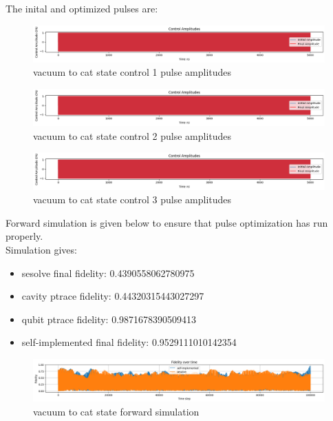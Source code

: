 \documentclass{article}
\begin{document}
The inital and optimized pulses are: 
\begin{figure}[H]
    \centering
    \includegraphics[width=0.6\linewidth]{vac2cat_effective_Hamiltonian_GRAPE_control1.png}
    \caption{vacuum to cat state control 1 pulse amplitudes}
    \label{fig:vac2cat_effective_Hamiltonian_GRAPE_control1}
\end{figure}
\begin{figure}[H]
    \centering
    \includegraphics[width=0.6\linewidth]{vac2cat_effective_Hamiltonian_GRAPE_control2.png}
    \caption{vacuum to cat state control 2 pulse amplitudes}
    \label{fig:vac2cat_effective_Hamiltonian_GRAPE_control2}
\end{figure}
\begin{figure}[H]
    \centering
    \includegraphics[width=0.6\linewidth]{vac2cat_effective_Hamiltonian_GRAPE_control3.png}
    \caption{vacuum to cat state control 3 pulse amplitudes}
    \label{fig:vac2cat_effective_Hamiltonian_GRAPE_control3}
\end{figure}

Forward simulation is given below to ensure that pulse optimization has run properly. 
\\
Simulation gives: 
\begin{itemize}
    \item sesolve final fidelity:  0.4390558062780975
    \item cavity ptrace fidelity:  0.44320315443027297
    \item qubit ptrace fidelity:  0.9871678390509413
    \item self-implemented final fidelity:  0.9529111010142354
\end{itemize}
\begin{figure}[H]
    \centering
    \includegraphics[width=0.6\linewidth]{vac2cat_effective_Hamiltonian_GRAPE_simulations.png}
    \caption{vacuum to cat state forward simulation}
    \label{fig:vac2cat_effective_Hamiltonian_GRAPE_simulations}
\end{figure}
\end{document}
